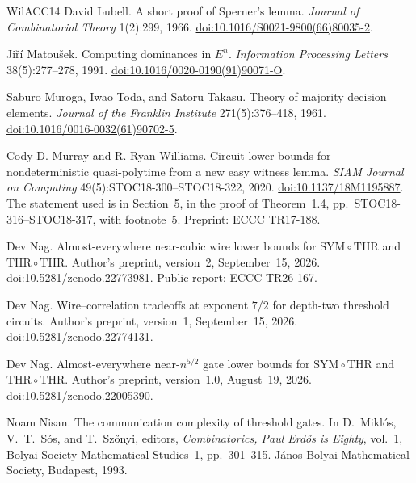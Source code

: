 \documentclass[11pt,letterpaper]{article}
\theoremstyle{definition}
\theoremstyle{remark}
\newcommand{\THR}{\mathrm{THR}}
\newcommand{\SYM}{\mathrm{SYM}}
\begin{document}
\begin{thebibliography}{WilACC14}
David Lubell. A short proof of Sperner's lemma.
\emph{Journal of Combinatorial Theory} 1(2):299, 1966.
\href{https://doi.org/10.1016/S0021-9800(66)80035-2}{doi:10.1016/S0021-9800(66)80035-2}.

Ji\v{r}\'i Matou\v{s}ek. Computing dominances in \(E^n\).
\emph{Information Processing Letters} 38(5):277--278, 1991.
\href{https://doi.org/10.1016/0020-0190(91)90071-O}{doi:10.1016/0020-0190(91)90071-O}.

Saburo Muroga, Iwao Toda, and Satoru Takasu.
Theory of majority decision elements.
\emph{Journal of the Franklin Institute} 271(5):376--418, 1961.
\href{https://doi.org/10.1016/0016-0032(61)90702-5}{doi:10.1016/0016-0032(61)90702-5}.

Cody D. Murray and R. Ryan Williams. Circuit lower bounds for
nondeterministic quasi-polytime from a new easy witness lemma.
\emph{SIAM Journal on Computing} 49(5):STOC18-300--STOC18-322, 2020.
\href{https://doi.org/10.1137/18M1195887}{doi:10.1137/18M1195887}.
The statement used is in Section~5, in the proof of Theorem~1.4,
pp.~STOC18-316--STOC18-317, with footnote~5. Preprint:
\href{https://eccc.weizmann.ac.il/report/2017/188/}{ECCC TR17-188}.

Dev Nag. Almost-everywhere near-cubic wire lower bounds for
\(\SYM\circ\THR\) and \(\THR\circ\THR\).
Author's preprint, version~2, September~15, 2026.
\href{https://doi.org/10.5281/zenodo.22773981}{doi:10.5281/zenodo.22773981}.
Public report: \href{https://eccc.weizmann.ac.il/report/2026/167/}{ECCC TR26-167}.

Dev Nag. Wire--correlation tradeoffs at exponent \(7/2\)
for depth-two threshold circuits.
Author's preprint, version~1, September~15, 2026.
\href{https://doi.org/10.5281/zenodo.22774131}{doi:10.5281/zenodo.22774131}.

Dev Nag. Almost-everywhere near-\(n^{5/2}\) gate lower bounds for
\(\SYM\circ\THR\) and \(\THR\circ\THR\).
Author's preprint, version~1.0, August~19, 2026.
\href{https://doi.org/10.5281/zenodo.22005390}{doi:10.5281/zenodo.22005390}.

Noam Nisan. The communication complexity of threshold gates.
In D.~Mikl\'os, V.~T.~S\'os, and T.~Sz\H{o}nyi, editors,
\emph{Combinatorics, Paul Erd\H{o}s is Eighty}, vol.~1,
Bolyai Society Mathematical Studies~1, pp.~301--315.
J\'anos Bolyai Mathematical Society, Budapest, 1993.


\end{thebibliography}
\end{document}
